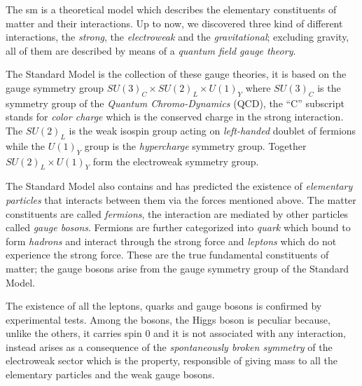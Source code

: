 The \gls{sm} is a theoretical model which describes the elementary constituents
of matter and their interactions. Up to now, we discovered three kind of
different interactions, the \emph{strong}, the \emph{electroweak} and the
\emph{gravitational}; excluding gravity, all of them are described by means of a
\emph{quantum field gauge theory}.

The Standard Model is the collection of these gauge theories, it is based on the
gauge symmetry group $SU(3)_C \times SU(2)_L \times U(1)_Y$ where $SU(3)_C$ is
the symmetry group of the \emph{Quantum Chromo-Dynamics} (QCD), the ``C''
subscript stands for \emph{color charge} which is the conserved charge in the
strong interaction. The $SU(2)_L$ is the weak isospin group acting on
\emph{left-handed} doublet of fermions while the $U(1)_Y$ group is the
\emph{hypercharge} symmetry group. Together $SU(2)_L \times U(1)_Y$ form the
electroweak symmetry group.

The Standard Model also contains and has predicted the existence of
\emph{elementary particles} that interacts between them via the forces mentioned
above. The matter constituents are called \emph{fermions}, the interaction are
mediated by other particles called \emph{gauge bosons}. Fermions are further
categorized into \emph{quark} which bound to form \emph{hadrons} and interact
through the strong force and \emph{leptons} which do not experience the strong
force. These are the true fundamental constituents of matter; the gauge bosons
arise from the gauge symmetry group of the Standard Model.

The existence of all the leptons, quarks and gauge bosons is confirmed by
experimental tests. Among the bosons, the Higgs boson is peculiar because,
unlike the others, it carries spin 0 and it is not associated with any
interaction, instead arises as a consequence of the \emph{spontaneously broken
  symmetry} of the electroweak sector which is the property, responsible of
giving mass to all the elementary particles and the weak gauge bosons.
